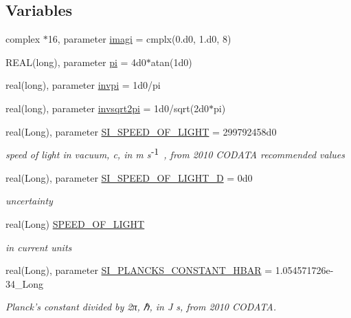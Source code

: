 \subsection*{Variables}
\begin{DoxyCompactItemize}
\item 
complex $\ast$16, parameter \hyperlink{namespaceclass__PhysicalConstants_ac45be97becb491b16f05e8f0695d03ba}{imagi} = cmplx(0.d0, 1.d0, 8)
\item 
REAL(long), parameter \hyperlink{namespaceclass__PhysicalConstants_a42d7c56a3a05fa73be90f78ecc833f34}{pi} = 4d0$\ast$atan(1d0)
\item 
real(long), parameter \hyperlink{namespaceclass__PhysicalConstants_a3c84b6c8e14a53682461f34fd08584bb}{invpi} = 1d0/pi
\item 
real(long), parameter \hyperlink{namespaceclass__PhysicalConstants_a7dee25e7580520ed07ea8ea46cd96706}{invsqrt2pi} = 1d0/sqrt(2d0$\ast$pi)
\item 
real(Long), parameter \hyperlink{namespaceclass__PhysicalConstants_a30ec603cc75f0d29a1429faabdce848c}{SI\_\-SPEED\_\-OF\_\-LIGHT} = 299792458d0
\begin{DoxyCompactList}\small\item\em speed of light in vacuum, c, in m s$^{\mbox{-\/1}}$ , from 2010 CODATA recommended values \item\end{DoxyCompactList}\item 
real(Long), parameter \hyperlink{namespaceclass__PhysicalConstants_aa56bb92d92839b2fef368f7be3640777}{SI\_\-SPEED\_\-OF\_\-LIGHT\_\-D} = 0d0
\begin{DoxyCompactList}\small\item\em uncertainty \item\end{DoxyCompactList}\item 
real(Long) \hyperlink{namespaceclass__PhysicalConstants_a44b1992769a901faa8885324ef348271}{SPEED\_\-OF\_\-LIGHT}
\begin{DoxyCompactList}\small\item\em in current units \item\end{DoxyCompactList}\item 
real(Long), parameter \hyperlink{namespaceclass__PhysicalConstants_a600c7e7a8a69f32b4bcab8d52fc15073}{SI\_\-PLANCKS\_\-CONSTANT\_\-HBAR} = 1.054571726e-\/34\_\-Long
\begin{DoxyCompactList}\small\item\em Planck's constant divided by 2π, ℏ, in J s, from 2010 CODATA. \item\end{DoxyCompactList}\item 

\end{DoxyCompactItemize}
